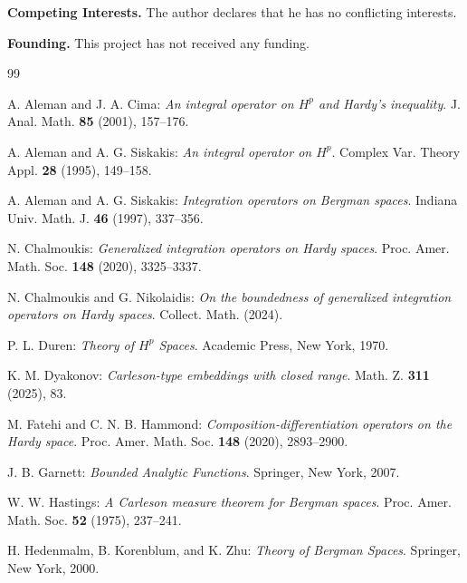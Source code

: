 \documentclass[preprint,12pt]{elsarticle}
\numberwithin{equation}{section}
\theoremstyle{remark}
\begin{document}
\medskip
\noindent
\textbf{Competing Interests.} The author declares that he has no conflicting interests.

\medskip
\noindent
\textbf{Founding.} This project has not received any funding.



\begin{thebibliography}{99}

A. Aleman and J. A. Cima:
\textit{An integral operator on $H^p$ and Hardy's inequality}.
J. Anal. Math. \textbf{85} (2001), 157--176.

A. Aleman and A. G. Siskakis:
\textit{An integral operator on $H^p$}.
Complex Var. Theory Appl. \textbf{28} (1995), 149--158.

A. Aleman and A. G. Siskakis:
\textit{Integration operators on Bergman spaces}.
Indiana Univ. Math. J. \textbf{46} (1997), 337--356.

N. Chalmoukis:
\textit{Generalized integration operators on Hardy spaces}.
Proc. Amer. Math. Soc. \textbf{148} (2020), 3325--3337.

N. Chalmoukis and G. Nikolaidis:
\textit{On the boundedness of generalized integration operators on Hardy spaces}.
Collect. Math. (2024).

P. L. Duren:
\textit{Theory of $H^p$ Spaces}.
Academic Press, New York, 1970.

K. M. Dyakonov:
\textit{Carleson-type embeddings with closed range}.
Math. Z. \textbf{311} (2025), 83.

M. Fatehi and C. N. B. Hammond:
\textit{Composition-differentiation operators on the Hardy space}.
Proc. Amer. Math. Soc. \textbf{148} (2020), 2893--2900.

J. B. Garnett:
\textit{Bounded Analytic Functions}.
Springer, New York, 2007.

W. W. Hastings:
\textit{A Carleson measure theorem for Bergman spaces}.
Proc. Amer. Math. Soc. \textbf{52} (1975), 237--241.

H. Hedenmalm, B. Korenblum, and K. Zhu:
\textit{Theory of Bergman Spaces}.
Springer, New York, 2000.


\end{thebibliography}
\end{document}

